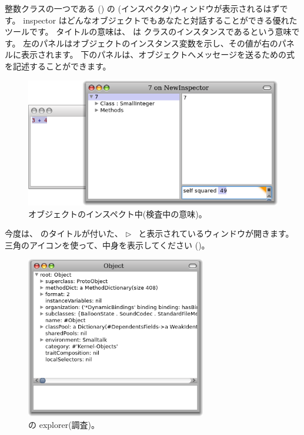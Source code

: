 \documentclass[a4paper,10pt,twoside]{book}
\begin{document}
\noindent
整数クラスの一つである  () の (インスペクタ)ウィンドウが表示されるはずです。
inspector はどんなオブジェクトでもあなたと対話することができる優れたツールです。
タイトルの意味は、 は  クラスのインスタンスであるという意味です。
左のパネルはオブジェクトのインスタンス変数を示し、その値が右のパネルに表示されます。
下のパネルは、オブジェクトへメッセージを送るための式を記述することができます。

\begin{figure}[htb]
\centerline {\includegraphics[width=\textwidth]{InspectIt}}
\caption{オブジェクトのインスペクト中(検査中の意味)。 }
\end{figure}



今度は、 のタイトルが付いた、
\mbox{$\triangleright$ } と表示されているウィンドウが開きます。
三角のアイコンを使って、中身を表示してください ()。

\begin{figure}[htb]
\centerline {\includegraphics[width=0.7\textwidth]{ExploreIt}}
\caption{ の explorer(調査)。}
\end{figure}
\end{document}
